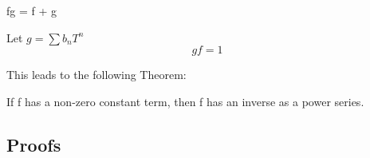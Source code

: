 \begin{thm}
  \; fg = \; f + \; g
\end{thm}

\begin{defn}
  Let $g = \sum b_n T^n$
  \[gf = 1\]
\end{defn}
This leads to the following Theorem:
\begin{thm}
  If f has a non-zero constant term, then f has an inverse as a power series.
\end{thm}

\subsection{Proofs}